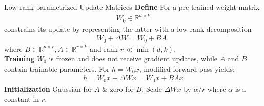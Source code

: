 \documentclass[aspectratio=169,xcolor=dvipsnames]{beamer}
\begin{document}
\begin{frame}{Low-rank-parametrized Update Matrices}
    \textbf{Define}
    For a pre-trained weight matrix         
        \begin{align*}
            W_0 \in \mathbb{R}^{d \times k}
        \end{align*}
        constrains its update by representing the latter with a low-rank decomposition
        \begin{align*}                
            W_0+\Delta W=W_0+B A, 
        \end{align*}
        where $B \in \mathbb{R}^{d \times r}, A \in \mathbb{R}^{r \times k}$ and rank $r \ll \min(d,k)$. \\
        \bigskip
        \textbf{Training}
        $W_0$ is frozen and does not receive gradient updates, while $A$ and $B$ contain trainable parameters. For $h=W_{0} x$, modified forward pass yields:
        \begin{align*}
            h=W_{0} x+\Delta W x=W_{0} x+B A x
        \end{align*}
        \textbf{Initialization} Gaussian for $A$ \& zero for $B$. Scale $\Delta Wx$ by $\alpha/r$ where $\alpha$ is a constant in $r$.  
\end{frame}
\end{document}

